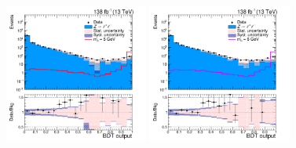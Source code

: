 \begin{figure}[htbp]
\begin{center}
		\includegraphics[width=0.42\textwidth]{figures/chapter04/BDT_score/mvaVal_M5_log.png}
		\includegraphics[width=0.42\textwidth]{figures/chapter04/BDT_score/mvaVal_M6_log.png}\\
    \label{fig:BDT_score1}
\end{center}
\end{figure}

